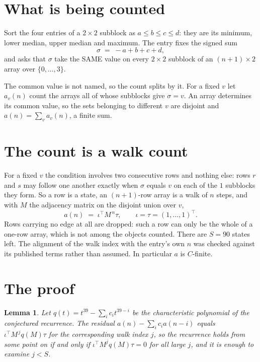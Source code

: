 \documentclass[11pt,a4paper]{article}
\theoremstyle{plain}
\newtheorem{lemma}[theorem]{Lemma}
\theoremstyle{definition}
\begin{document}
\section{What is being counted}

Sort the four entries of a $2\times2$ subblock as $a\le b\le c\le d$: they
are its minimum, lower median, upper median and maximum. The entry fixes the signed sum
\[
\sigma\;=\;-a+b+c+d,
\]
and asks that $\sigma$ take the SAME value on every $2\times2$ subblock of an
$(n+1)\times2$ array over $\{0,\dots,3\}$.

The common value is not named, so the count splits by it. For a fixed $v$ let $a_v(n)$ count
the arrays all of whose subblocks give $\sigma=v$. An array determines its common value, so
the sets belonging to different $v$ are disjoint and $a(n)=\sum_v a_v(n)$, a finite sum.


\section{The count is a walk count}

For a fixed $v$ the condition involves two consecutive rows and nothing
else: rows $r$ and $s$ may follow one another exactly when $\sigma$ equals $v$ on each of the
$1$ subblocks they form. So a row is a state, an $(n+1)$-row array is a walk of $n$
steps, and with $M$ the adjacency matrix on the disjoint union over $v$,
\[
a(n)\;=\;\iota^{\!\top}M^{\,n}\tau,\qquad\iota=\tau=(1,\dots,1)^{\!\top} .
\]
Rows carrying no edge at all are dropped: such a row can only be the whole of a one-row
array, which is not among the objects counted. There are $S=90$ states left.
The alignment of the walk index with the entry's own $n$ was checked against its published
terms rather than assumed. In particular $a$ is $C$-finite.

\section{The proof}

\begin{lemma}\label{lem:crit}
Let $q(t)=t^{39}-\sum_i c_it^{39-i}$ be the characteristic polynomial of the
conjectured recurrence. The residual $a(n)-\sum_ic_ia(n-i)$ equals
$\iota^{\!\top}M^{\,j}q(M)\tau$ for the corresponding walk index $j$, so the recurrence
holds from some point on if and only if $\iota^{\!\top}M^{j}q(M)\tau=0$ for all large $j$,
and it is enough to examine $j<S$.
\end{lemma}
\end{document}
